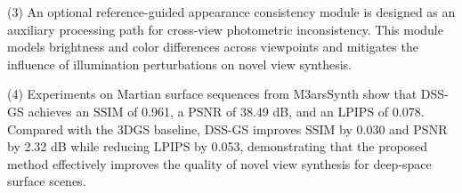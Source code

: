\begin{engabstract}
    (3) An optional reference-guided appearance consistency module is designed as an auxiliary processing path for cross-view photometric inconsistency. This module models brightness and color differences across viewpoints and mitigates the influence of illumination perturbations on novel view synthesis.

    (4) Experiments on Martian surface sequences from M3arsSynth show that DSS-GS achieves an $\mathrm{SSIM}$ of 0.961, a $\mathrm{PSNR}$ of 38.49 dB, and an $\mathrm{LPIPS}$ of 0.078. Compared with the 3DGS baseline, DSS-GS improves $\mathrm{SSIM}$ by 0.030 and $\mathrm{PSNR}$ by 2.32 dB while reducing $\mathrm{LPIPS}$ by 0.053, demonstrating that the proposed method effectively improves the quality of novel view synthesis for deep-space surface scenes.

\end{engabstract}
